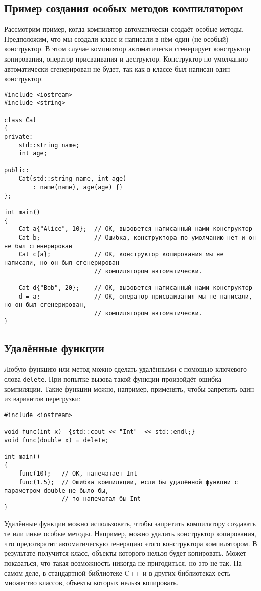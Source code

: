 \documentclass{article}
\begin{document}
\newpage
\subsection*{Пример создания особых методов компилятором}
Рассмотрим пример, когда компилятор автоматически создаёт особые методы.
Предположим, что мы создали класс и написали в нём один (не особый) конструктор.
В этом случае компилятор автоматически сгенерирует конструктор копирования, оператор присваивания и деструктор. Конструктор по умолчанию автоматически сгенерирован не будет, так как в классе был написан один конструктор.
\begin{lstlisting}
#include <iostream>
#include <string>

class Cat
{
private:
	std::string name;
	int age;
	
public:
	Cat(std::string name, int age) 
		: name(name), age(age) {}
};

int main()
{
	Cat a{"Alice", 10};  // OK, вызовется написанный нами конструктор
	Cat b;               // Ошибка, конструктора по умолчанию нет и он не был сгенерирован
	Cat c{a};            // OK, конструктор копирования мы не написали, но он был сгенерирован
						 // компилятором автоматически.

	Cat d{"Bob", 20};    // OK, вызовется написанный нами конструктор
	d = a;               // OK, оператор присваивания мы не написали, но он был сгенерирован,
						 // компилятором автоматически.
}
\end{lstlisting}
\subsection*{Удалённые функции}
Любую функцию или метод можно сделать удалёнными с помощью ключевого слова \texttt{delete}. При попытке вызова такой функции произойдёт ошибка компиляции. Такие функции можно, например, применять, чтобы запретить один из вариантов перегрузки:
\begin{lstlisting}
#include <iostream>

void func(int x)  {std::cout << "Int"  << std::endl;}
void func(double x) = delete;

int main()
{
	func(10);   // OK, напечатает Int
	func(1.5);  // Ошибка компиляции, если бы удалённой функции с параметром double не было бы,
	            // то напечатал бы Int
}
\end{lstlisting}

\newpage
Удалённые функции можно использовать, чтобы запретить компилятору создавать те или иные особые методы.
Например, можно удалить конструктор копирования, что предотвратит автоматическую генерацию этого конструктора компилятором. В результате получится класс, объекты которого нельзя будет копировать. Может показаться, что такая возможность никогда не пригодиться, но это не так. На самом деле, в стандартной библиотеке C++ и в других библиотеках есть множество классов, объекты которых нельзя копировать.
\end{document}
